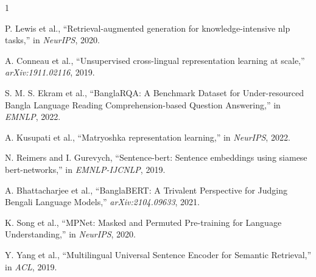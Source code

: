 \documentclass[10pt, conference, compsocconf]{IEEEtran}
\begin{document}
\begin{thebibliography}{1}

    P. Lewis et al., ``Retrieval-augmented generation for knowledge-intensive nlp tasks,'' in \emph{NeurIPS}, 2020.
    
    A. Conneau et al., ``Unsupervised cross-lingual representation learning at scale,'' \emph{arXiv:1911.02116}, 2019.
    
    S. M. S. Ekram et al., ``BanglaRQA: A Benchmark Dataset for Under-resourced Bangla Language Reading Comprehension-based Question Answering,'' in \emph{EMNLP}, 2022.
    
    A. Kusupati et al., ``Matryoshka representation learning,'' in \emph{NeurIPS}, 2022.
    
    N. Reimers and I. Gurevych, ``Sentence-bert: Sentence embeddings using siamese bert-networks,'' in \emph{EMNLP-IJCNLP}, 2019.

    A. Bhattacharjee et al., ``BanglaBERT: A Trivalent Perspective for Judging Bengali Language Models,'' \emph{arXiv:2104.09633}, 2021.
    
    K. Song et al., ``MPNet: Masked and Permuted Pre-training for Language Understanding,'' in \emph{NeurIPS}, 2020.
    
    Y. Yang et al., ``Multilingual Universal Sentence Encoder for Semantic Retrieval,'' in \emph{ACL}, 2019.

\end{thebibliography}
\end{document}
